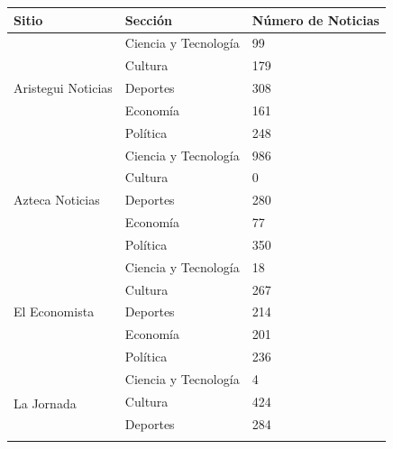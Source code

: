 \begin{table}[H]
\begin{tabular}{|l|l|l|}
\hline
Sitio                               & Sección              & Número de Noticias \\ \hline
\multirow{5}{*}{Aristegui Noticias} & Ciencia y Tecnología & 99                 \\ \cline{2-3} 
                                    & Cultura              & 179                \\ \cline{2-3} 
                                    & Deportes             & 308                \\ \cline{2-3} 
                                    & Economía             & 161                \\ \cline{2-3} 
                                    & Política             & 248                \\ \hline
\multirow{5}{*}{Azteca Noticias}    & Ciencia y Tecnología & 986                \\ \cline{2-3} 
                                    & Cultura              & 0                  \\ \cline{2-3} 
                                    & Deportes             & 280                \\ \cline{2-3} 
                                    & Economía             & 77                 \\ \cline{2-3} 
                                    & Política             & 350                \\ \hline
\multirow{5}{*}{El Economista}      & Ciencia y Tecnología & 18                 \\ \cline{2-3} 
                                    & Cultura              & 267                \\ \cline{2-3} 
                                    & Deportes             & 214                \\ \cline{2-3} 
                                    & Economía             & 201                \\ \cline{2-3} 
                                    & Política             & 236                \\ \hline
\multirow{5}{*}{La Jornada}         & Ciencia y Tecnología & 4                  \\ \cline{2-3} 
                                    & Cultura              & 424                \\ \cline{2-3} 
                                    & Deportes             & 284                \\ \cline{2-3} 

\end{tabular}
\end{table}
